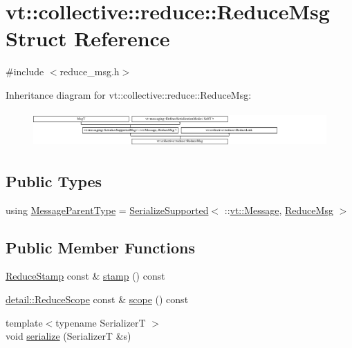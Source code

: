 \hypertarget{structvt_1_1collective_1_1reduce_1_1_reduce_msg}{}\section{vt\+:\+:collective\+:\+:reduce\+:\+:Reduce\+Msg Struct Reference}
\label{structvt_1_1collective_1_1reduce_1_1_reduce_msg}


{\ttfamily \#include $<$reduce\+\_\+msg.\+h$>$}

Inheritance diagram for vt\+:\+:collective\+:\+:reduce\+:\+:Reduce\+Msg\+:\begin{figure}[H]
\begin{center}
\leavevmode
\includegraphics[height=1.382716cm]{structvt_1_1collective_1_1reduce_1_1_reduce_msg}
\end{center}
\end{figure}
\subsection*{Public Types}
\begin{DoxyCompactItemize}
\item 
using \hyperlink{structvt_1_1collective_1_1reduce_1_1_reduce_msg_a5c736b83ddd821bdce047715e0b606f2}{Message\+Parent\+Type} = \hyperlink{namespacevt_a3862b8e3f67ab03f3a4313d828592fa9}{Serialize\+Supported}$<$ \+::\hyperlink{namespacevt_a3a3ddfef40b4c90915fa43cdd5f129ea}{vt\+::\+Message}, \hyperlink{structvt_1_1collective_1_1reduce_1_1_reduce_msg}{Reduce\+Msg} $>$
\end{DoxyCompactItemize}
\subsection*{Public Member Functions}
\begin{DoxyCompactItemize}
\item 
\hyperlink{namespacevt_1_1collective_1_1reduce_a7b7cb3021ac5654d92825d9fab0250b2}{Reduce\+Stamp} const  \& \hyperlink{structvt_1_1collective_1_1reduce_1_1_reduce_msg_a7b2f5ab707e75bc16a244759dfbecdd6}{stamp} () const
\item 
\hyperlink{structvt_1_1collective_1_1reduce_1_1detail_1_1_reduce_scope}{detail\+::\+Reduce\+Scope} const  \& \hyperlink{structvt_1_1collective_1_1reduce_1_1_reduce_msg_a7b31a26204ab86778a9058e42589e549}{scope} () const
\item 
{\footnotesize template$<$typename SerializerT $>$ }\\void \hyperlink{structvt_1_1collective_1_1reduce_1_1_reduce_msg_acd139b8eebfbd0ea925dac39032e5717}{serialize} (SerializerT \&s)
\end{DoxyCompactItemize}
